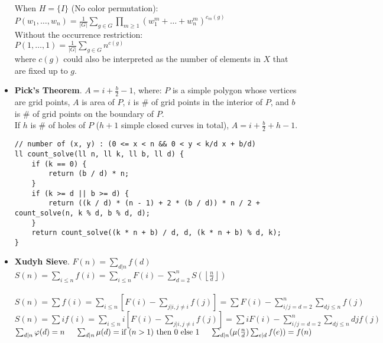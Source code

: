 \documentclass[landscape, 8pt, a4paper, oneside, twocolumn]{extarticle}
\begin{document}
\begin{itemize}
    When $H=\{I\}$ (No color permutation): \\
    $P(w_1,\ldots ,w_n)=\frac{1}{\left|G\right|}\sum_{g\in G}\prod_{m\ge 1}(w_1^m+\ldots +w_n^m)^{c_m(g)}$ \\

    Without the occurrence restriction: \\
    $P(1,\ldots,1)=\frac{1}{\left|G\right|}\sum_{g\in G}n^{c(g)}$ \\
    where $c(g)$ could also be interpreted as the number of elements in $X$ that are fixed up to $g$.
    \item \textbf{Pick's Theorem}. $A=i+\frac{b}{2}-1$, where: $P$ is a simple polygon whose vertices are grid points, $A$ is area of $P$, $i$ is \# of grid points in the interior of $P$, and $b$ is \# of grid points on the boundary of $P$. \\
    If $h$ is \# of holes of $P$ ($h+1$ simple closed curves in total), $A=i+\frac{b}{2}+h-1$.
\begin{verbatim}
// number of (x, y) : (0 <= x < n && 0 < y < k/d x + b/d)
ll count_solve(ll n, ll k, ll b, ll d) {
	if (k == 0) {
		return (b / d) * n;
	}
	if (k >= d || b >= d) {
		return ((k / d) * (n - 1) + 2 * (b / d)) * n / 2 + count_solve(n, k % d, b % d, d);
	}
	return count_solve((k * n + b) / d, d, (k * n + b) % d, k);
}
\end{verbatim}
    \item \textbf{Xudyh Sieve}.
    $F(n)=\sum_{d\vert n}f(d)$ \\
    $S(n)=\sum_{i\leq n}f(i)=\sum_{i\leq n}F(i)-\sum_{d=2}^n S\left(\left\lfloor \frac{n}{d}\right\rfloor\right)$ \\
     \\
    $S(n)=\sum f(i) = \sum_{i\leq n}\left[F(i)-\sum_{j|i,j\neq i}f(j)\right]=\sum F(i) - \sum_{i/j=d=2}^n\sum_{dj\leq n}f(j)$ \\
    $S(n)=\sum if(i) = \sum_{i\leq n}i\left[F(i)-\sum_{j|i,j\neq i}f(j)\right]=\sum iF(i) - \sum_{i/j=d=2}^n\sum_{dj\leq n}djf(j)$ \\
    $\sum_{d\vert n}\varphi (d)=n\hspace{0.5cm}\sum_{d\vert n}\mu (d)=\text{if } (n > 1) \text{ then } 0 \text{ else } 1\hspace{0.5cm}\sum_{d\vert n}(\mu (\frac{n}{d})\sum_{e\vert d}f(e))=f(n)$ \\
\end{itemize}
\end{document}
